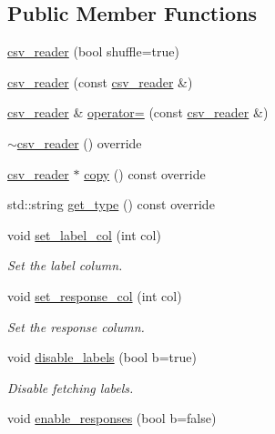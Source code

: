\subsection*{Public Member Functions}
\begin{DoxyCompactItemize}
\item 
\hyperlink{classlbann_1_1csv__reader_ac301a4c8e2ef029b65e8f6b8cbbc5855}{csv\+\_\+reader} (bool shuffle=true)
\item 
\hyperlink{classlbann_1_1csv__reader_a6482322efe56d495bcea4df65ebf381a}{csv\+\_\+reader} (const \hyperlink{classlbann_1_1csv__reader}{csv\+\_\+reader} \&)
\item 
\hyperlink{classlbann_1_1csv__reader}{csv\+\_\+reader} \& \hyperlink{classlbann_1_1csv__reader_aaede525f7ac80484691822f27ef79cfc}{operator=} (const \hyperlink{classlbann_1_1csv__reader}{csv\+\_\+reader} \&)
\item 
\hyperlink{classlbann_1_1csv__reader_aa992b822439071b8c38115726680003b}{$\sim$csv\+\_\+reader} () override
\item 
\hyperlink{classlbann_1_1csv__reader}{csv\+\_\+reader} $\ast$ \hyperlink{classlbann_1_1csv__reader_a6a45ad54bb7f2b30722d70ea8921243d}{copy} () const override
\item 
std\+::string \hyperlink{classlbann_1_1csv__reader_a0ff6a8f07f69a0927ba0bac36ad31864}{get\+\_\+type} () const override
\item 
void \hyperlink{classlbann_1_1csv__reader_ad21bef8b7e1c1f9a03724475f987580c}{set\+\_\+label\+\_\+col} (int col)
\begin{DoxyCompactList}\small\item\em Set the label column. \end{DoxyCompactList}\item 
void \hyperlink{classlbann_1_1csv__reader_aed2d76ec0f0a338047a4d15fc43413fb}{set\+\_\+response\+\_\+col} (int col)
\begin{DoxyCompactList}\small\item\em Set the response column. \end{DoxyCompactList}\item 
void \hyperlink{classlbann_1_1csv__reader_ad69e57123eba2002a693aedb87dc14f3}{disable\+\_\+labels} (bool b=true)
\begin{DoxyCompactList}\small\item\em Disable fetching labels. \end{DoxyCompactList}\item 
void \hyperlink{classlbann_1_1csv__reader_a7f2f980b860939e561d669575da9fb49}{enable\+\_\+responses} (bool b=false)

\end{DoxyCompactItemize}
